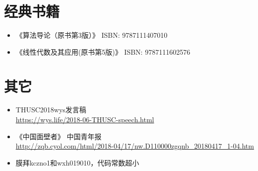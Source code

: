 \section{经典书籍}
\begin{itemize}
    \item 《算法导论（原书第3版）》 ISBN: 9787111407010
    \item 《线性代数及其应用(原书第5版)》 ISBN: 9787111602576
\end{itemize}
\section{其它}
\begin{itemize}
    \item THUSC2018wys发言稿 \\\url{https://wys.life/2018-06-THUSC-speech.html}
    \item 《中国面壁者》 中国青年报\\
    {\footnotesize \url{http://zqb.cyol.com/html/2018-04/17/nw.D110000zgqnb\_20180417\_1-04.htm}}
    \item 膜拜kczno1和wxh019010，代码常数超小
\end{itemize}
